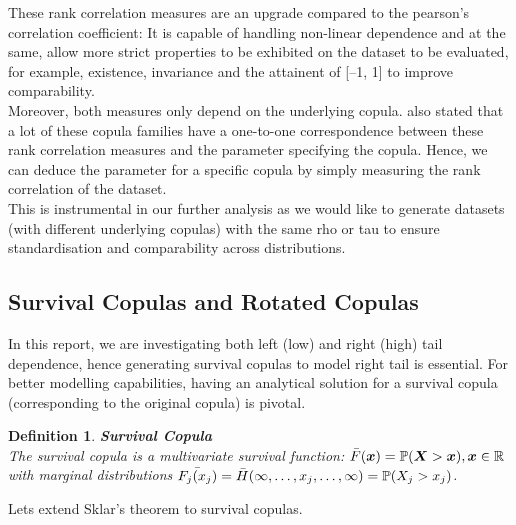 \documentclass[12pt]{report}
\newtheorem{definition}{Definition}[subsection]
\newcommand{\1}{\mathbf{1}}
\begin{document}
These rank correlation measures are an upgrade compared to the pearson's correlation coefficient: It is capable of handling non-linear dependence and at the same, allow more strict properties to be exhibited on the dataset to be evaluated, for example, existence, invariance and the attainent of [--1, 1] to improve comparability. \\
\vspace{0.5cm}
Moreover, both measures only depend on the underlying copula. \cite{HofertBook} also stated that a lot of these copula families have a one-to-one correspondence between these rank correlation measures and the parameter specifying the copula. Hence, we can deduce the parameter for a specific copula by simply measuring the rank correlation of the dataset.\\
\vspace{0.5cm}
This is instrumental in our further analysis as we would like to generate datasets (with different underlying copulas) with the same rho or tau to ensure standardisation and comparability across distributions.

\subsection{Survival Copulas and Rotated Copulas}
\vspace{0.5cm}
In this report, we are investigating both left (low) and right (high) tail dependence, hence generating survival copulas to model right tail is essential. For better modelling capabilities, having an analytical solution for a survival copula (corresponding to the original copula) is pivotal.

\begin{definition}\label{SurvivalCopulaDefinition}
\textbf{Survival Copula} \\
The survival copula is a multivariate survival function: $\Bar{F}(\boldsymbol{x}) = \mathbb{P}(\boldsymbol{X} > \boldsymbol{x}), \boldsymbol{x} \in \mathbb{R}$ with marginal distributions $\Bar{F_{j}(x_{j})} = \Bar{H}(\infty, \dots, x_{j}, \dots, \infty) = \mathbb{P}(X_{j} > x_{j})$.
\end{definition}

Lets extend Sklar's theorem to survival copulas.
\end{document}
